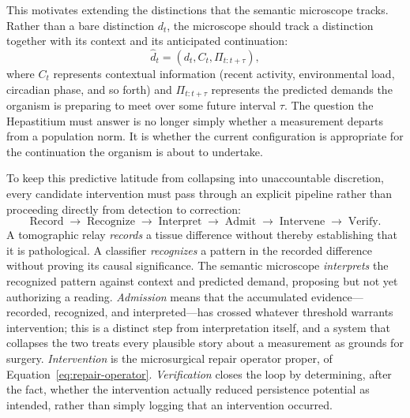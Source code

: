 \documentclass[12pt]{article}
\begin{document}
This motivates extending the distinctions that the semantic microscope tracks. Rather than a bare distinction $d_t$, the microscope should track a distinction together with its context and its anticipated continuation:
\begin{equation}
\hat{d}_t = (d_t, C_t, \Pi_{t:t+\tau}),
\label{eq:extended-distinction}
\end{equation}
where $C_t$ represents contextual information (recent activity, environmental load, circadian phase, and so forth) and $\Pi_{t:t+\tau}$ represents the predicted demands the organism is preparing to meet over some future interval $\tau$. The question the Hepastitium must answer is no longer simply whether a measurement departs from a population norm. It is whether the current configuration is appropriate for the continuation the organism is about to undertake.

To keep this predictive latitude from collapsing into unaccountable discretion, every candidate intervention must pass through an explicit pipeline rather than proceeding directly from detection to correction:
\begin{equation}
\text{Record} \;\rightarrow\; \text{Recognize} \;\rightarrow\; \text{Interpret} \;\rightarrow\; \text{Admit} \;\rightarrow\; \text{Intervene} \;\rightarrow\; \text{Verify}.
\label{eq:rraiv}
\end{equation}
A tomographic relay \emph{records} a tissue difference without thereby establishing that it is pathological. A classifier \emph{recognizes} a pattern in the recorded difference without proving its causal significance. The semantic microscope \emph{interprets} the recognized pattern against context and predicted demand, proposing but not yet authorizing a reading. \emph{Admission} means that the accumulated evidence---recorded, recognized, and interpreted---has crossed whatever threshold warrants intervention; this is a distinct step from interpretation itself, and a system that collapses the two treats every plausible story about a measurement as grounds for surgery. \emph{Intervention} is the microsurgical repair operator proper, of Equation~\eqref{eq:repair-operator}. \emph{Verification} closes the loop by determining, after the fact, whether the intervention actually reduced persistence potential as intended, rather than simply logging that an intervention occurred.
\end{document}
